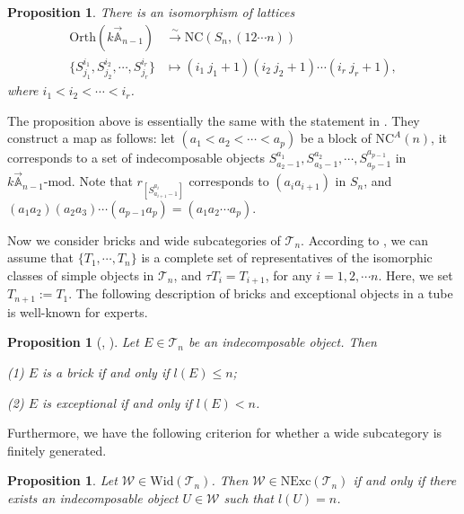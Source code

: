 \documentclass[a4paper, 11pt, reqno]{amsart}
\numberwithin{equation}{section}
\newtheorem{prop}[thm]{Proposition}
\theoremstyle{remark}
\theoremstyle{definition}
\begin{document}
\begin{prop} \label{correspondence for type A}
   There is an isomorphism of lattices
   \begin{align*}
      \mathrm{Orth}(k \vec{\mathbb A}_{n-1}) &\xrightarrow{\sim} \mathrm{NC}(S_n, (12\cdots n))\\
      \{S^{i_1}_{j_1}, S^{i_2}_{j_2},\cdots, S^{i_r}_{j_r} \} &\mapsto (i_1 \ j_1+1)(i_2 \ j_2+1) \cdots (i_r \ j_r+1),
   \end{align*}
   where $i_1 <i_2< \cdots <i_r$.
\end{prop}

The proposition above is essentially the same with the statement in \cite[Lemma 6.2]{krause2021category}. They construct a map as follows: let $(a_1< a_2< \cdots< a_p)$ be a block of $\mathrm{NC}^A(n)$, it corresponds to a set of indecomposable objects $S^{a_1}_{a_2-1},S^{a_2}_{a_3-1},\cdots,S^{a_{p-1}}_{a_p-1}$ in $k \vec{\mathbb A}_{n-1} \text{-mod}$. Note that $r_{[S^{a_i}_{a_{i+1}-1}]}$ corresponds to $(a_i a_{i+1})$ in $S_n$, and $(a_1 a_2)(a_2 a_3)\cdots (a_{p-1} a_p)=(a_1 a_2 \cdots a_p)$.

Now we consider bricks and wide subcategories of $\mathcal T_n$. According to \cite[Subsection~1.8]{chen2009introduction}, we can assume that $\{T_1,\cdots,T_n \}$ is a complete set of representatives of the isomorphic classes of simple objects in $\mathcal T_n$, and $\tau T_i=T_{i+1}$, for any $i=1,2, \cdots n$. Here, we set $T_{n+1}:=T_1$. The following description of bricks and exceptional objects in a tube is well-known for experts.

\begin{prop} [{\cite[Corollary 2.2.5]{dichev2009thick}, \cite[Lemma 4.2]{cheng2024wide}}]\label{tube indec length}
   Let $E \in \mathcal T_n$ be an indecomposable object. Then

   (1) $E$ is a brick if and only if $l(E) \leq n$;

   (2) $E$ is exceptional if and only if $l(E)<n$.
\end{prop}

Furthermore, we have the following criterion for whether a wide subcategory is finitely generated.

\begin{prop} \cite[Proposition 4.4(3)]{cheng2024wide} \label{prop nexc wide subcat tube}
   Let $\mathcal W \in \mathrm{Wid}(\mathcal T_n)$. Then $\mathcal W \in \mathrm{NExc}(\mathcal T_n)$ if and only if there exists an indecomposable object $U \in \mathcal W$ such that $l(U)=n$.
\end{prop}
\end{document}

